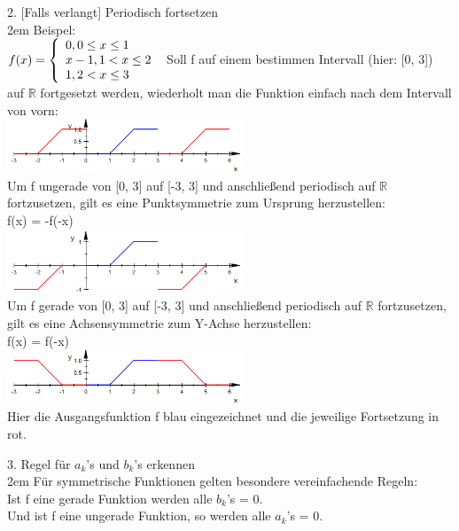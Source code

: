 \documentclass[11pt,final]{scrreprt}
\newcommand{\br} {\medskip\\}
\newcommand{\R} {\mathbb R}
\begin{document}
2. [Falls verlangt] Periodisch fortsetzen\br

\begingroup
\leftskip2em 
Beispel:\br
$
f(x) = \left\{
\begin{array}{l}
0, 0\leq x\leq 1 \\ 
x-1, 1 < x\leq 2 \\
1, 2 < x\leq 3 \\
\end{array}
\right.\\\br
$
Soll f auf einem bestimmen Intervall (hier: [0, 3]) auf $\R$ fortgesetzt werden, wiederholt man die Funktion einfach nach dem Intervall von vorn: \\
\includegraphics[width=200pt]{images/fourierPeriodischeFortsetzung}\br
Um f ungerade von [0, 3] auf [-3, 3] und anschließend periodisch auf $\R$ fortzusetzen, gilt es eine Punktsymmetrie zum Ursprung herzustellen:\\
f(x) = -f(-x)\\
\includegraphics[width=200pt]{images/fourierUngeradeFortsetzung}\br
Um f gerade von [0, 3] auf [-3, 3] und anschließend periodisch auf $\R$ fortzusetzen, gilt es eine Achsensymmetrie zum Y-Achse herzustellen:\\
f(x) = f(-x)\\
\includegraphics[width=200pt]{images/fourierGeradeFortsetzung}\br
Hier die Ausgangsfunktion f blau eingezeichnet und die jeweilige Fortsetzung in rot.\\
\par	
\endgroup 

3. Regel für $a_k$'s und $b_k$'s erkennen\br

\begingroup
\leftskip2em 
Für symmetrische Funktionen gelten besondere vereinfachende Regeln:\br
Ist f eine gerade Funktion werden alle $b_k$'s = 0.\\
Und ist f eine ungerade Funktion, so werden alle $a_k$'s = 0.\\
\par	
\endgroup 
\end{document}
